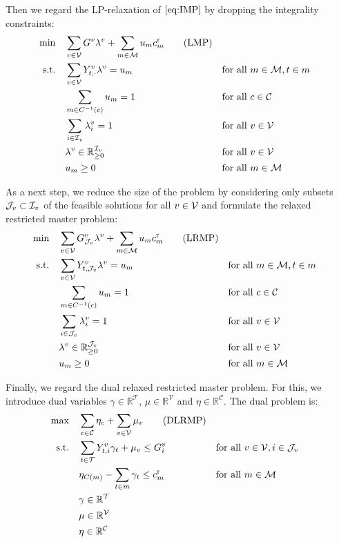Then we regard the LP-relaxation of $\eqref{eq:IMP}$ by dropping the integrality constraints:
\begin{align*}
	\min \quad & \sum_{v\in\mathcal{V}}G^v\lambda^v + \sum_{m\in\mathcal{M}}u_mc^{\operatorname{r}}_m \tag{LMP} \label{eq:LMP} \\
	\text{s.t.} \quad & \sum_{v\in\mathcal{V}} Y^v_{t,\cdot}\lambda^v = u_m && \text{for all } m\in\mathcal{M},t\in m \\
	& \sum_{m\in C^{-1}(c)} u_m = 1 && \text{for all } c\in\mathcal{C} \\
	& \sum_{i\in\mathcal{I}_v}\lambda_i^v=1 && \text{for all } v\in\mathcal{V}\\
	& \lambda^v\in\mathbb{R}_{\geq 0}^{\mathcal{I}_v} && \text{for all } v\in\mathcal{V} \\
	& u_m\geq 0 && \text{for all } m\in\mathcal{M}
\end{align*}

As a next step, we reduce the size of the problem by considering only subsets $\mathcal{J}_v\subset\mathcal{I}_v$ of the feasible solutions for all $v\in\mathcal{V}$ and formulate the relaxed restricted master problem:
\begin{align*}
	\min \quad & \sum_{v\in\mathcal{V}}G^v_{\mathcal{J}_v}\lambda^v + \sum_{m\in\mathcal{M}}u_mc^{\operatorname{r}}_m \tag{LRMP} \label{eq:LRMP} \\
	\text{s.t.} \quad & \sum_{v\in\mathcal{V}} Y^v_{t,\mathcal{J}_v}\lambda^v = u_m && \text{for all } m\in\mathcal{M},t\in m \\
	& \sum_{m\in C^{-1}(c)} u_m = 1 && \text{for all } c\in\mathcal{C} \\
	& \sum_{i\in\mathcal{J}_v}\lambda_i^v=1 && \text{for all } v\in\mathcal{V}\\
	& \lambda^v\in\mathbb{R}_{\geq 0}^{\mathcal{J}_v} && \text{for all } v\in\mathcal{V} \\
	& u_m\geq 0 && \text{for all } m\in\mathcal{M}
\end{align*}

Finally, we regard the dual relaxed restricted master problem. For this, we introduce dual variables $\gamma\in\mathbb{R}^{\mathcal{T}}$, $\mu\in\mathbb{R}^{\mathcal{V}}$ and $\eta\in\mathbb{R}^{\mathcal{C}}$. The dual problem is:
\begin{align}
	\max \quad & \sum_{c\in\mathcal{C}}\eta_c + \sum_{v\in\mathcal{V}}\mu_v \tag{DLRMP} \label{eq:DLRMP} \\
	\text{s.t.} \quad & \sum_{t\in\mathcal{T}} Y^v_{t,i}\gamma_t + \mu_v \leq G^v_i && \text{for all } v\in\mathcal{V},i\in\mathcal{J}_v \label{eq:DLRMP:vehicle} \\
	& \eta_{C(m)} - \sum_{t\in m}\gamma_t \leq c^{\operatorname{r}}_m && \text{for all } m\in\mathcal{M} \label{eq:DLRMP:route} \\
	& \gamma\in\mathbb{R}^{\mathcal{T}} \nonumber \\
	& \mu\in\mathbb{R}^{\mathcal{V}} \nonumber \\
	& \eta\in\mathbb{R}^{\mathcal{C}} \nonumber
\end{align}

